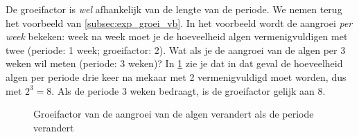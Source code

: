 De groeifactor is \emph{wel} afhankelijk van de
lengte van de periode. We nemen terug het voorbeeld van \cref{subsec:exp_groei_vb}.  In het voorbeeld wordt de aangroei \emph{per week}  bekeken: week na week moet je de hoeveelheid algen vermenigvuldigen met twee (periode: 1 week; groeifactor: 2). Wat als je de aangroei van de algen per 3 weken wil meten (periode: 3 weken)? In \cref{fig:algen_periode} zie je dat in dat geval de hoeveelheid algen per periode drie keer na mekaar met 2 vermenigvuldigd moet worden, dus met $2^3=8$. Als de periode 3 weken bedraagt, is de groeifactor gelijk aan 8.
\begin{figure}[htbp]
    \centering
{}
    \caption{Groeifactor van de aangroei van de algen verandert als de periode verandert }
    \label{fig:algen_periode}
\end{figure}

